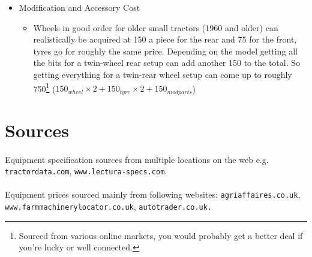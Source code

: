 \documentclass[a4paper,10pt]{article}
\begin{document}
\begin{itemize}
\item Modification and Accessory Cost
  \begin{itemize}
  \item Wheels in good order for older small tractors (1960 and older) can
    realistically be acquired at \textsterling{}150 a piece for the rear and
    \textsterling{}75 for the front, tyres go for roughly the same
    price. Depending on the model getting all the bits for a twin-wheel rear
    setup can add another \textsterling{}150 to the total. So getting everything
    for a twin-rear wheel setup can come up to roughly
    \textsterling{}750\footnote{Sourced from various online markets, you would
    probably get a better deal if you're lucky or well connected.} ($
    150_{wheel} \times 2 + 150_{tyre} \times 2 + 150_{mod parts}$)
  \end{itemize}
\end{itemize}

\section{Sources}
\paragraph{} Equipment specification sources from multiple locations on the web
\newline e.g. \verb|tractordata.com|, \verb|www.lectura-specs.com|.

\paragraph{} Equipment prices sourced mainly from following websites:
\newline \verb|agriaffaires.co.uk|, \verb|www.farmmachinerylocator.co.uk|,
\verb|autotrader.co.uk.|
\end{document}
